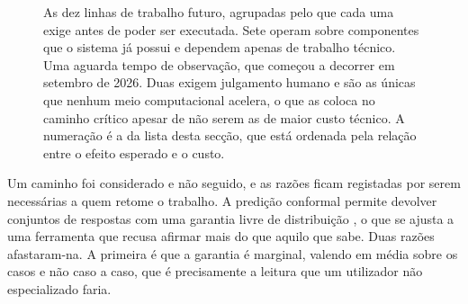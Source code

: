\begin{figure}[ht]
\centering
{}
\caption[As linhas futuras, por aquilo que as desbloqueia]{As dez linhas de trabalho futuro,
agrupadas pelo que cada uma exige antes de poder ser executada. Sete operam sobre componentes que
o sistema já possui e dependem apenas de trabalho técnico. Uma aguarda tempo de observação, que
começou a decorrer em setembro de 2026. Duas exigem julgamento humano e são as únicas que nenhum
meio computacional acelera, o que as coloca no caminho crítico apesar de não serem as de maior
custo técnico. A numeração é a da lista desta secção, que está ordenada pela relação entre o
efeito esperado e o custo.}
\label{fig:con_futuro}
\end{figure}

Um caminho foi considerado e não seguido, e as razões ficam registadas por serem necessárias a quem
retome o trabalho. A predição conformal permite devolver conjuntos de respostas com uma garantia
livre de distribuição \autocite{vovk2005algorithmic, angelopoulos2023conformal}, o que se ajusta a
uma ferramenta que recusa afirmar mais do que aquilo que sabe. Duas razões afastaram-na. A primeira é
que a garantia é marginal, valendo em média sobre os casos e não caso a caso, que é precisamente a
leitura que um utilizador não especializado faria.


